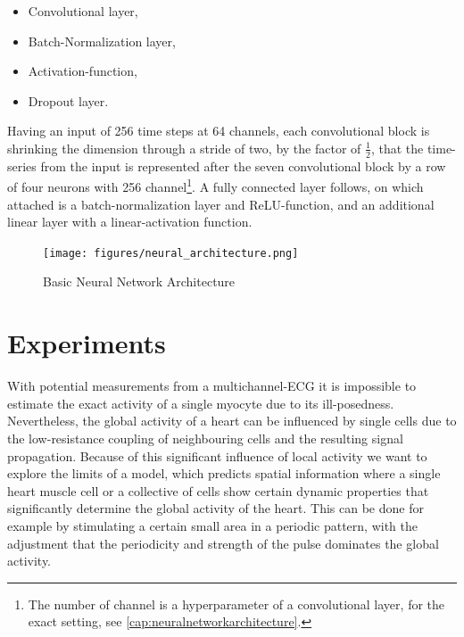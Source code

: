 \begin{itemize}
    \item Convolutional layer,
    \item Batch-Normalization layer,
    \item Activation-function,
    \item Dropout layer.
\end{itemize}
Having an input of 256 time steps at 64 channels, each convolutional block is shrinking the dimension through a stride of two, by the factor of $\frac{1}{2}$, that the time-series from the input is represented after the seven convolutional block by a row of four neurons with 256 channel\footnote{The number of channel is a hyperparameter of a convolutional layer, for the exact setting, see \ref{cap:neuralnetworkarchitecture}.}. A fully connected layer follows, on which attached is a batch-normalization layer and ReLU-function, and an additional linear layer with a linear-activation function.\\

\begin{figure}[ht]
    \center
    \texttt{[image: figures/neural\_architecture.png]}
	\caption{Basic Neural Network Architecture}
	\label{fig:cnn_architecture}
\end{figure}


\section{Experiments}
With potential measurements from a multichannel-ECG it is impossible to estimate the exact activity of a single myocyte due to its ill-posedness. 
Nevertheless, the global activity of a heart can be influenced by single cells due to the low-resistance coupling of neighbouring cells and the resulting signal propagation. Because of this significant influence of local activity we want to explore the limits of a model, which predicts spatial information where a single heart muscle cell or a collective of cells show certain dynamic properties that significantly determine the global activity of the heart. This can be done for example by stimulating a certain small area in a periodic pattern, with the adjustment that the periodicity and strength of the pulse dominates the global activity.

